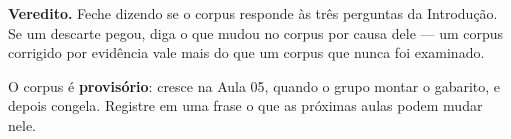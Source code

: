 \documentclass[
  article,
  12pt,
  oneside,
  a4paper,
  english,
  brazil
]{abntex2}\usepackage[]{graphicx}\usepackage[]{xcolor}
\begin{document}
\textbf{Veredito.} Feche dizendo se o corpus responde às três perguntas da
Introdução. Se um descarte pegou, diga o que mudou no corpus por causa dele
--- um corpus corrigido por evidência vale mais do que um corpus que nunca foi
examinado.

O corpus é \textbf{provisório}: cresce na Aula 05, quando o grupo montar o
gabarito, e depois congela. Registre em uma frase o que as próximas aulas
podem mudar nele.

\postextual

\end{document}
